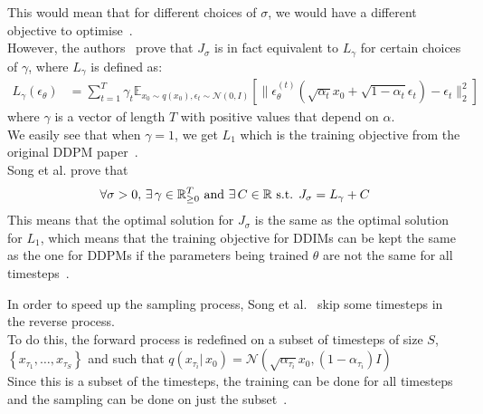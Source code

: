 \documentclass[twoside]{article}
\numberwithin{equation}{section}
\numberwithin{figure}{section}
\begin{document}
This would mean that for different choices of $\sigma$, we would have a different objective to optimise~\cite{song2022denoising}. \\
However, the authors~\cite{song2022denoising} prove that $J_\sigma$ is in fact equivalent to $L_\gamma$ for certain choices of $\gamma$, where $L_\gamma$ is defined as:
\begin{align}
  L_\gamma (\epsilon_\theta) &= \sum_{t=1}^{T} \gamma_t \mathbb{E}_{x_0 \sim q(x_0), \epsilon_t \sim \mathcal{N}(0, I)}  \left[ \| \epsilon_\theta^{(t)} (\sqrt{\alpha_t} x_0 + \sqrt{1 - \alpha_t} \epsilon_t) - \epsilon_t \|_2^2 \right]
\end{align}
where $\gamma$ is a vector of length $T$ with positive values that depend on $\alpha$. \\
We easily see that when $\gamma = 1$, we get $L_1$ which is the training objective from the original DDPM paper~\cite{ho2020denoising, song2022denoising}. \\
Song et al. prove that
\begin{align}
  \forall \sigma > 0, \, \exists \, \gamma \in \mathbb{R}_{\geq 0}^T \text{ and } \exists \, C \in \mathbb{R} \text{ s.t. } J_\sigma = L_\gamma + C \notag
\end{align}
This means that the optimal solution for $J_\sigma$ is the same as the optimal solution for $L_1$, which means that the training objective for DDIMs can be kept the same as the one for DDPMs if the parameters being trained $\theta$ are not the same for all timesteps~\cite{song2022denoising}.

In order to speed up the sampling process, Song et al.~\cite{song2022denoising} skip some timesteps in the reverse process. \\
To do this, the forward process is redefined on a subset of timesteps of size $S$, $\left\{ x_{\tau_1}, \dots, x_{\tau_S} \right\}$ and such that $q(x_{\tau_i} | \, x_0) = \mathcal{N}(\sqrt{\alpha_{\tau_i}} x_0, (1 - \alpha_{\tau_i})I)$ \\
Since this is a subset of the timesteps, the training can be done for all timesteps and the sampling can be done on just the subset~\cite{song2022denoising}.
\end{document}

